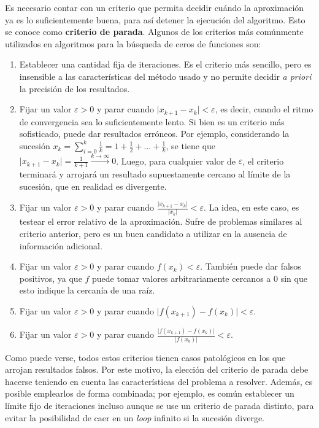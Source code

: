 Es necesario contar con un criterio que permita decidir cuándo la aproximación
ya es lo suficientemente buena, para así detener la ejecución del algoritmo.
Esto se conoce como \textbf{criterio de parada}. Algunos de los criterios más
comúnmente utilizados en algoritmos para la búsqueda de ceros de funciones
son:
\begin{enumerate}[label=(\roman*)]
\item Establecer una cantidad fija de iteraciones. Es el criterio más sencillo,
    pero es insensible a las características del método usado y no permite
    decidir \emph{a priori} la precisión de los resultados.
\item Fijar un valor $\varepsilon > 0$ y parar cuando
    $\lvert x_{k+1} - x_k \rvert < \varepsilon$, es decir, cuando el ritmo de
    convergencia sea lo suficientemente lento. Si bien es un criterio más
    sofisticado, puede dar resultados erróneos. Por ejemplo, considerando la
    sucesión $x_k = \sum_{i=0}^k \frac{1}{k} = 1 + \frac{1}{2} + \dots +
    \frac{1}{k}$, se tiene que $\lvert x_{k+1} - x_k \rvert = \frac{1}{k+1}
    \xrightarrow{k \to \infty} 0$. Luego, para cualquier valor de
    $\varepsilon$, el criterio terminará y arrojará un resultado
    supuestamente cercano al límite de la sucesión, que en realidad es
    divergente.
\item Fijar un valor $\varepsilon > 0$ y parar cuando
    $\frac{\lvert x_{k+1} - x_k \rvert}{\lvert x_k \rvert} < \varepsilon$. La
    idea, en este caso, es testear el error relativo de la aproximación.
    Sufre de problemas similares al criterio anterior, pero es un buen
    candidato a utilizar en la ausencia de información adicional.
\item Fijar un valor $\varepsilon > 0$ y parar cuando $f(x_k) < \varepsilon$.
    También puede dar falsos positivos, ya que $f$ puede tomar valores
    arbitrariamente cercanos a $0$ sin que esto indique la cercanía de una
    raíz.
\item Fijar un valor $\varepsilon > 0$ y parar cuando $\lvert f(x_{k+1}) -
    f(x_k) \rvert < \varepsilon$.
\item Fijar un valor $\varepsilon > 0$ y parar cuando $\frac{\lvert f(x_{k+1})
    - f(x_k) \rvert}{\lvert f(x_k)\rvert} < \varepsilon$.
\end{enumerate}

Como puede verse, todos estos criterios tienen casos patológicos en los que
arrojan resultados falsos. Por este motivo, la elección del criterio de parada
debe hacerse teniendo en cuenta las características del problema a resolver.
Además, es posible emplearlos de forma combinada; por ejemplo, es común
establecer un límite fijo de iteraciones incluso aunque se use un criterio de
parada distinto, para evitar la posibilidad de caer en un \emph{loop} infinito
si la sucesión diverge.

